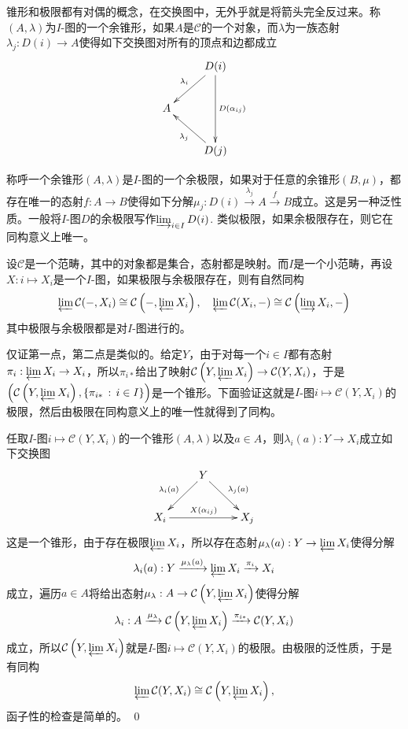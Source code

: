 \para 锥形和极限都有对偶的概念，在交换图中，无外乎就是将箭头完全反过来。称$(A,\lambda)$为$I$-图的一个{余锥形}，如果$A$是$\mathcal{C}$的一个对象，而$\lambda$为一族态射$\lambda_{j}:D(i)\to A$使得如下交换图对所有的顶点和边都成立
\[
	\xymatrix{
		&D(i)\ar[ld]_{\lambda_i}\ar[dd]^{D(\alpha_{ij})}\\
		A&\\
		&D(j)\ar[lu]^{\lambda_j}
	}
\]

称呼一个余锥形$(A,\lambda)$是$I$-图的一个{余极限}，如果对于任意的余锥形$(B,\mu)$，都存在唯一的态射$f:A\to B$使得如下分解$\mu_j:D(i)\xrightarrow{\lambda_j}A\xrightarrow{f}B$成立。这是另一种泛性质。一般将$I$-图$D$的余极限写作$\varinjlim_{i\in I} D(i)$. 类似极限，如果余极限存在，则它在同构意义上唯一。

\pro 设$\mathcal{C}$是一个范畴，其中的对象都是集合，态射都是映射。而$I$是一个小范畴，再设$X:i\mapsto X_i$是一个$I$-图，如果极限与余极限存在，则有自然同构
\[
	\varprojlim \mathcal{C}(-,X_i)\cong \mathcal{C}\left(-,\varprojlim X_i\right),\quad \varprojlim \mathcal{C}(X_i,-)\cong  \mathcal{C}\left(\varinjlim X_i,-\right)
\]
其中极限与余极限都是对$I$-图进行的。

\proof
	仅证第一点，第二点是类似的。给定$Y$，由于对每一个$i\in I$都有态射$\pi_i: \varprojlim X_i\to X_i$，所以$\pi_{i*}$给出了映射$\mathcal{C}\left(Y,\varprojlim X_i\right)\to \mathcal{C}(Y,X_i)$，于是$\left(\mathcal{C}\left(Y,\varprojlim X_i\right),\{\pi_{i*}\,:\, i\in I\}\right)$是一个锥形。下面验证这就是$I$-图$i\mapsto \mathcal{C}(Y,X_i)$的极限，然后由极限在同构意义上的唯一性就得到了同构。

	任取$I$-图$i\mapsto \mathcal{C}(Y,X_i)$的一个锥形$(A,\lambda)$以及$a\in A$，则$\lambda_i(a):Y\to X_i$成立如下交换图
	\[
		\xymatrix{
			&Y \ar[dl]_{\lambda_{i}(a)}\ar[dr]^{\lambda_{j}(a)}&\\
			X_i\ar[rr]^{X(\alpha_{ij})}&&X_j
		}
	\]
	这是一个锥形，由于存在极限$\varprojlim X_i$，所以存在态射$\mu_\lambda(a):Y\to \varprojlim X_i$使得分解
	\[
		\lambda_i(a):Y\xrightarrow{\mu_\lambda(a)}\varprojlim X_i\xrightarrow{\pi_i}X_i
	\]
	成立，遍历$a\in A$将给出态射$\mu_\lambda:A\to \mathcal{C}\left(Y,\varprojlim X_i\right)$使得分解
	\[
	\lambda_i: A\xrightarrow{\mu_\lambda}\mathcal{C}\left(Y,\varprojlim X_i\right)\xrightarrow{\pi_{i*}}\mathcal{C}(Y,X_i)
	\]
	成立，所以$\mathcal{C}\left(Y,\varprojlim X_i\right)$就是$I$-图$i\mapsto \mathcal{C}(Y,X_i)$的极限。由极限的泛性质，于是有同构
	\[
		\varprojlim \mathcal{C}(Y,X_i)\cong \mathcal{C}\left(Y,\varprojlim X_i\right),
	\]
	函子性的检查是简单的。
\qed

